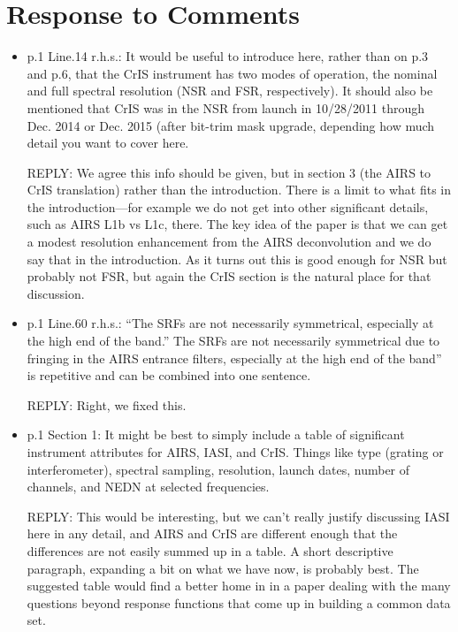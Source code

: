 \documentclass[11pt]{article}
\newcommand {\reply} {\mbox{\small REPLY}}
\begin{document}
\section{Response to Comments}

\begin{itemize}

\item p.1 Line.14 r.h.s.: It would be useful to introduce here,
  rather than on p.3 and p.6, that the CrIS instrument has two modes
  of operation, the nominal and full spectral resolution (NSR and
  FSR, respectively).  It should also be mentioned that CrIS was in
  the NSR from launch in 10/28/2011 through Dec. 2014 or Dec. 2015
  (after bit-trim mask upgrade, depending how much detail you want
  to cover here.

  \reply: We agree this info should be given, but in section 3 (the
  AIRS to CrIS translation) rather than the introduction.  There is
  a limit to what fits in the introduction---for example we do not
  get into other significant details, such as AIRS L1b vs L1c,
  there.  The key idea of the paper is that we can get a modest
  resolution enhancement from the AIRS deconvolution and we do say
  that in the introduction.  As it turns out this is good enough for
  NSR but probably not FSR, but again the CrIS section is the
  natural place for that discussion.
  

\item p.1 Line.60 r.h.s.: ``The SRFs are not necessarily
  symmetrical, especially at the high end of the band.''  The SRFs
  are not necessarily symmetrical due to fringing in the AIRS
  entrance filters, especially at the high end of the band” is
  repetitive and can be combined into one sentence.

  \reply: Right, we fixed this.

\item p.1 Section 1: It might be best to simply include a table of
  significant instrument attributes for AIRS, IASI, and CrIS. Things
  like type (grating or interferometer), spectral sampling,
  resolution, launch dates, number of channels, and NEDN at selected
  frequencies.

  \reply: This would be interesting, but we can't really justify
  discussing IASI here in any detail, and AIRS and CrIS are
  different enough that the differences are not easily summed up in
  a table.  A short descriptive paragraph, expanding a bit on what
  we have now, is probably best.  The suggested table would find a
  better home in in a paper dealing with the many questions beyond
  response functions that come up in building a common data set.


\end{itemize}
\end{document}
